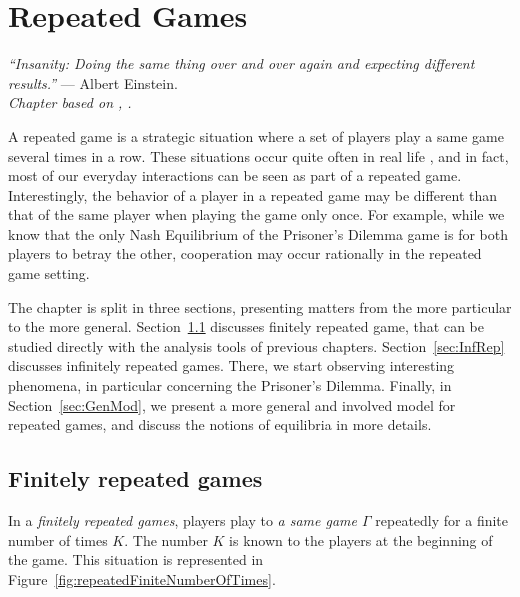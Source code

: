 \ifx \globalmark \undefined %
	
\else
\fi




\chapter{Repeated Games}
{\large{\itshape
``Insanity: Doing the same thing over and over again and expecting different results.''} --- Albert Einstein.\\
}
\label{chap:Rep}
{\small{\itshape
Chapter based on \cite[pages 308 - 331]{MyGTAO}, \cite[Section 6.1]{ShLeMSAG}.}\\
}

A repeated game is a strategic situation where a set of players play a same
game several times in a row. These situations occur quite often in real life
, and in fact, most of our everyday interactions can be seen as part of a
repeated game.\\
Interestingly, the behavior of a player in a repeated game may be different
than that of the same player when playing the game only once. For example,
while we know that the only Nash Equilibrium of the Prisoner's Dilemma game
is for both players to betray the other, cooperation may occur rationally
in the repeated game setting.

The chapter is split in three sections, presenting matters from the more
particular to the more general. Section~\ref{sec:FinRep} discusses finitely
repeated game, that can be studied directly with the analysis tools of
previous chapters. Section~\ref{sec:InfRep} discusses infinitely repeated
games. There, we start observing interesting phenomena, in particular
concerning the Prisoner's Dilemma. Finally, in Section~\ref{sec:GenMod}, we
present a more general and involved model for repeated games, and discuss
the notions of equilibria in more details.

\section{Finitely repeated games}
\label{sec:FinRep}
In a \emph{finitely repeated games}, players play to \emph{a same game
$\Gamma$} repeatedly for a finite number of times $K$. The number $K$ is
known to the players at the beginning of the game. This situation is
represented in Figure~\ref{fig:repeatedFiniteNumberOfTimes}.

